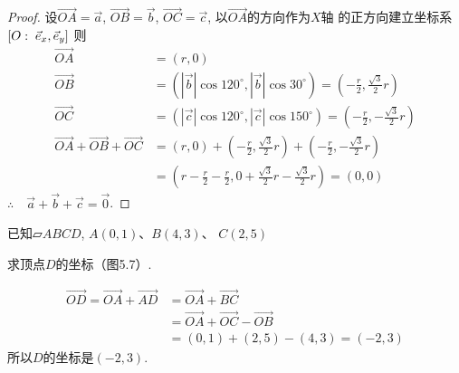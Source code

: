 \begin{proof}
    设$\Vec{OA}=\vec{a}$, $\Vec{OB}=\vec{b}$, 
$\Vec{OC}=\vec{c}$, 以$\Vec{OA}$的方向作为$X$轴
的正方向建立坐标系$[O:\; \vec{e}_x,\vec{e}_y]$
则 
\[\begin{split}
    \Vec{OA}&=(r, 0)\\
    \Vec{OB}&=\left(|\vec{b}|\cos120^{\circ}, |\vec{b}|\cos 30^{\circ}\right)=\left(-\frac{r}{2},\frac{\sqrt{3}}{2}r\right)\\
    \Vec{OC}&=\left(|\vec{c}|\cos120^{\circ}, |\vec{c}|\cos 150^{\circ}\right)=\left(-\frac{r}{2},-\frac{\sqrt{3}}{2}r\right)\\
    \Vec{OA}+  \Vec{OB}+\Vec{OC}&=(r,0)+\left(-\frac{r}{2},\frac{\sqrt{3}}{2}r\right)+\left(-\frac{r}{2},-\frac{\sqrt{3}}{2}r\right)\\
    &=\left(r-\frac{r}{2}-\frac{r}{2}, 0+\frac{\sqrt{3}}{2}r-\frac{\sqrt{3}}{2}r\right)=(0,0)
\end{split}\]
$\therefore\quad \vec{a}+\vec{b}+\vec{c}=\vec{0}$.
\end{proof}

\begin{example}
    已知$\parallelogram{ABCD}$, $A(0,1)$、$B(4,3)$、
$C(2,5)$

求顶点$D$的坐标（图5.7）.
\end{example}

\begin{solution}
\[\begin{split}
\Vec{OD}=\Vec{OA}+\Vec{AD}&=\Vec{OA}+\Vec{BC}\\
&=\Vec{OA}+\Vec{OC}-\Vec{OB}\\
&=(0,1)+(2,5)-(4,3)=(-2,3)
\end{split}\]
所以$D$的坐标是$(-2,3)$.
\end{solution}

